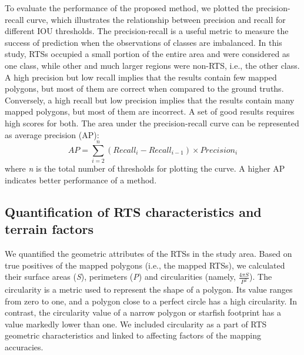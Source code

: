 \documentclass[authoryear,preprint,review,12pt]{elsarticle}
\begin{document}
To evaluate the performance of the proposed method, we plotted the precision-recall curve, which illustrates the relationship between precision and recall for different IOU thresholds. The precision-recall is a useful metric to measure the success of prediction when the observations of classes are imbalanced. In this study, RTSs occupied a small portion of the entire area and were considered as one class, while other and much larger regions were non-RTS, i.e., the other class. A high precision but low recall implies that the results contain few mapped polygons, but most of them are correct when compared to the ground truths. Conversely, a high recall but low precision implies that the results contain many mapped polygons, but most of them are incorrect. A set of good results requires high scores for both. The area under the precision-recall curve can be represented as average precision (AP):
\begin{equation}
AP=\sum_{i=2}^{n} (Recall_i - Recall_{i-1})\times Precision_i 
\label{equ_ap}
\end{equation}
where \emph{n} is the total number of thresholds for plotting the curve. A higher AP indicates better performance of a method.


\subsection{Quantification of RTS characteristics and terrain factors}
\label{subsec_quantify_rts}

We quantified the geometric attributes of the RTSs in the study area. Based on true positives of the mapped polygons (i.e., the mapped RTSs), we calculated their surface areas (\emph{S}), perimeters (\emph{P}) and circularities (namely, $\frac{4 \pi S}{P^2} $). The circularity is a metric used to represent the shape of a polygon. Its value ranges from zero to one, and a polygon close to a perfect circle has a high circularity. In contrast, the circularity value of a narrow polygon or starfish footprint has a value markedly lower than one. We included  circularity as a part of RTS geometric characteristics and linked to affecting factors of the mapping accuracies.
\end{document}
